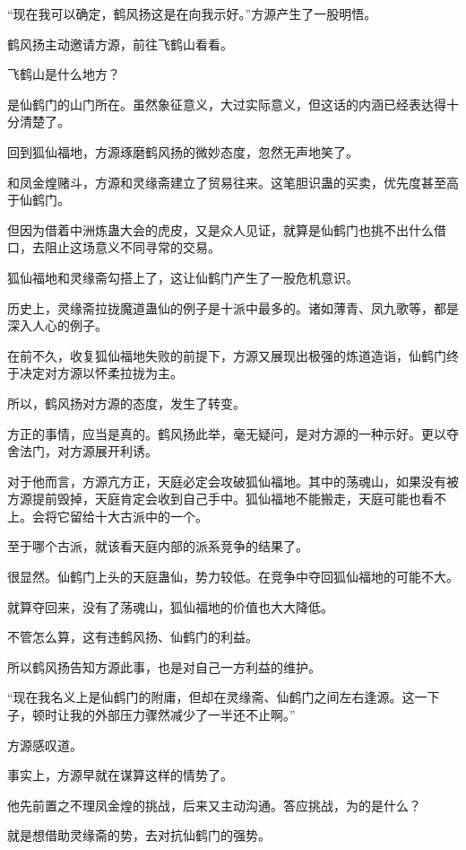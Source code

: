 
\begin{this_body}

“现在我可以确定，鹤风扬这是在向我示好。”方源产生了一股明悟。

鹤风扬主动邀请方源，前往飞鹤山看看。

飞鹤山是什么地方？

是仙鹤门的山门所在。虽然象征意义，大过实际意义，但这话的内涵已经表达得十分清楚了。

回到狐仙福地，方源琢磨鹤风扬的微妙态度，忽然无声地笑了。

和凤金煌赌斗，方源和灵缘斋建立了贸易往来。这笔胆识蛊的买卖，优先度甚至高于仙鹤门。

但因为借着中洲炼蛊大会的虎皮，又是众人见证，就算是仙鹤门也挑不出什么借口，去阻止这场意义不同寻常的交易。

狐仙福地和灵缘斋勾搭上了，这让仙鹤门产生了一股危机意识。

历史上，灵缘斋拉拢魔道蛊仙的例子是十派中最多的。诸如薄青、凤九歌等，都是深入人心的例子。

在前不久，收复狐仙福地失败的前提下，方源又展现出极强的炼道造诣，仙鹤门终于决定对方源以怀柔拉拢为主。

所以，鹤风扬对方源的态度，发生了转变。

方正的事情，应当是真的。鹤风扬此举，毫无疑问，是对方源的一种示好。更以夺舍法门，对方源展开利诱。

对于他而言，方源亢方正，天庭必定会攻破狐仙福地。其中的荡魂山，如果没有被方源提前毁掉，天庭肯定会收到自己手中。狐仙福地不能搬走，天庭可能也看不上。会将它留给十大古派中的一个。

至于哪个古派，就该看天庭内部的派系竞争的结果了。

很显然。仙鹤门上头的天庭蛊仙，势力较低。在竞争中夺回狐仙福地的可能不大。

就算夺回来，没有了荡魂山，狐仙福地的价值也大大降低。

不管怎么算，这有违鹤风扬、仙鹤门的利益。

所以鹤风扬告知方源此事，也是对自己一方利益的维护。

“现在我名义上是仙鹤门的附庸，但却在灵缘斋、仙鹤门之间左右逢源。这一下子，顿时让我的外部压力骤然减少了一半还不止啊。”

方源感叹道。

事实上，方源早就在谋算这样的情势了。

他先前置之不理凤金煌的挑战，后来又主动沟通。答应挑战，为的是什么？

就是想借助灵缘斋的势，去对抗仙鹤门的强势。


\end{this_body}
